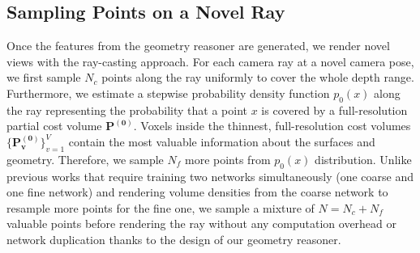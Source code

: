 \subsection{Sampling Points on a Novel Ray} \label{sec:c3_sampling}

Once the features from the geometry reasoner are generated, we render novel views with the ray-casting approach. For each camera ray at a novel camera pose, we first sample $N_{c}$ points along the ray uniformly to cover the whole depth range. Furthermore, we estimate a stepwise probability density function $p_{0}(x)$ along the ray representing the probability that a point $x$ is covered by a full-resolution partial cost volume $\boldsymbol{P^{(0)}}$. Voxels inside the thinnest, full-resolution cost volumes $\{\boldsymbol{P_{v}^{(0)}}\}_{v=1}^{V}$ contain the most valuable information about the surfaces and geometry. Therefore, we sample $N_{f}$ more points from $p_{0}(x)$ distribution. Unlike previous works\citep{mildenhall2020nerf,yu2021pixelnerf, wang2021ibrnet, reizenstein2021common, arandjelovic2021nerf} that require training two networks simultaneously (one coarse and one fine network) and rendering volume densities from the coarse network to resample more points for the fine one, we sample a mixture of $N=N_{c} + N_{f}$ valuable points before rendering the ray without any computation overhead or network duplication thanks to the design of our geometry reasoner.

